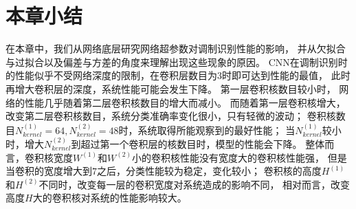 %
%
%
%
%
%
%
%

\section{本章小结}

在本章中，我们从网络底层研究网络超参数对调制识别性能的影响，
并从欠拟合与过拟合以及偏差与方差的角度来理解出现这些现象的原因。
CNN在调制识别时的性能似乎不受网络深度的限制，在卷积层数目为$3$时即可达到性能的最值，
此时再增大卷积层的深度，系统性能可能会发生下降。
第一层卷积核数目较小时，
网络的性能几乎随着第二层卷积核数目的增大而减小。
而随着第一层卷积核增大，改变第二层卷积核数目，系统分类准确率变化很小，只有轻微的波动；
卷积核数目$N_{kernel}^{(1)} =64, N_{kernel}^{(2)} =48$时，系统取得所能观察到的最好性能；
当$N_{kernel}^{(1)}$较小时，增大$N_{kernel}^{(2)}$到超过第一个卷积层的核数目时，模型的性能会下降。
整体而言，卷积核宽度$W^{(1)}$和$W^{(2)}$小的卷积核性能没有宽度大的卷积核性能强，
但是当卷积的宽度增大到$7$之后，分类性能较为稳定，变化较小；
卷积核的高度$H^{(1)}$和$H^{(2)}$不同时，改变每一层的卷积宽度对系统造成的影响不同，
相对而言，改变高度$H$大的卷积核对系统的性能影响较大。\par
